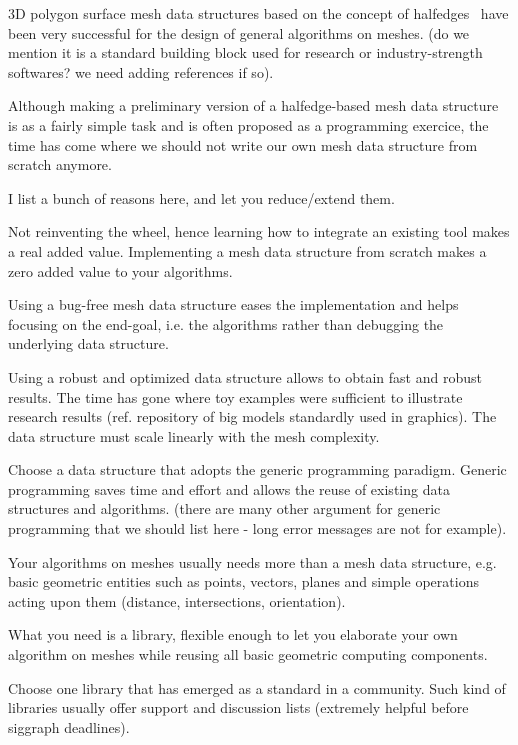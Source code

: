 

3D polygon surface mesh data structures based on the concept of
halfedges~\cite{k-ugpdd-99} have been very successful for the design
of general algorithms on meshes. (do we mention it is a standard
building block used for research or industry-strength softwares? we
need adding references if so).


Although making a preliminary version of a halfedge-based mesh data
structure is as a fairly simple task and is often proposed as a
programming exercice, the time has come where we should not write our
own mesh data structure from scratch anymore. 

I list a bunch of reasons here, and let you reduce/extend them.

Not reinventing the wheel, hence learning how to integrate an existing
tool makes a real added value. Implementing a mesh data structure from
scratch makes a zero added value to your algorithms.

Using a bug-free mesh data structure eases the implementation and
helps focusing on the end-goal, i.e. the algorithms rather than
debugging the underlying data structure.

Using a robust and optimized data structure allows to obtain fast and
robust results. The time has gone where toy examples were sufficient
to illustrate research results (ref. repository of big models
standardly used in graphics). The data structure must scale linearly
with the mesh complexity.

Choose a data structure that adopts the generic programming paradigm.
Generic programming saves time and effort and allows the reuse of
existing data structures and algorithms. (there are many other
argument for generic programming that we should list here - long error
messages are not for example).

Your algorithms on meshes usually needs more than a mesh data
structure, e.g. basic geometric entities such as points, vectors,
planes and simple operations acting upon them (distance,
intersections, orientation).

What you need is a library, flexible enough to let you elaborate your
own algorithm on meshes while reusing all basic geometric computing
components.

Choose one library that has emerged as a standard in a community.
Such kind of libraries usually offer support and discussion lists
(extremely helpful before siggraph deadlines).

